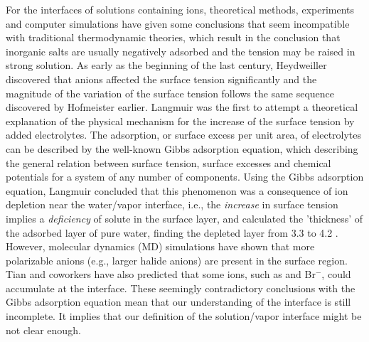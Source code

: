 For the interfaces of solutions containing ions, theoretical methods, experiments and computer simulations have given some conclusions that seem incompatible with traditional thermodynamic theories, which result in the conclusion that inorganic salts are usually negatively adsorbed and the tension may
be raised in strong solution\cite{Gibbs1928, Adam1941}.
As early as the beginning of the last century, Heydweiller discovered that anions affected the surface tension significantly
and the magnitude of the variation of the surface tension follows the same sequence discovered by Hofmeister earlier\cite{dosSantos10}.
Langmuir\cite{Langmuir1917} was the first to attempt a theoretical explanation of the physical mechanism for the increase of the surface tension by added electrolytes.
The adsorption, or surface excess per unit area, of electrolytes can be described by the well-known Gibbs adsorption equation, which describing the general relation between
surface tension, surface excesses and chemical potentials for a system of any number of components.
Using the Gibbs adsorption equation, Langmuir concluded that this phenomenon was a consequence of ion depletion 
near the water/vapor interface, i.e., the \emph{increase} in surface tension 
implies a \emph{deficiency} of solute in the surface layer\cite{Jarvis1968}, and
calculated the 'thickness' of the adsorbed layer of pure water, finding 
the depleted layer from 3.3 to 4.2 \A. 
%
However, molecular dynamics (MD) simulations have shown that more polarizable anions (e.g., larger halide anions) 
are present in the surface region\cite{Jungwirth2001,Jungwirth2002}. 
Tian and coworkers\cite{CST11} have also predicted that some ions, such as \I and Br$^{-}$, could accumulate at the interface.
These seemingly contradictory conclusions with the Gibbs adsorption equation mean that our understanding of the interface is still incomplete. 
It implies that our definition of the solution/vapor interface might be not clear enough. 
